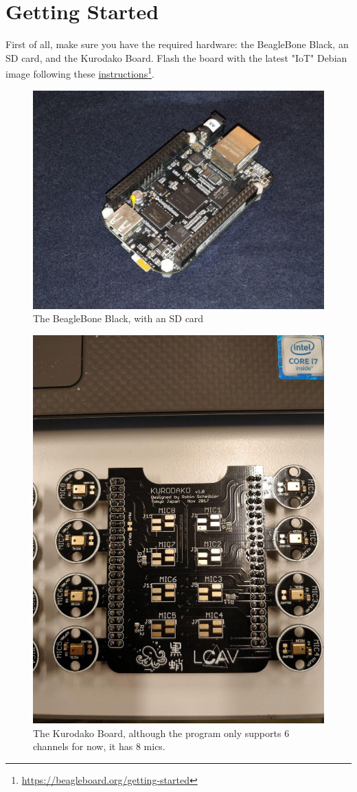 \documentclass[]{report}
\begin{document}
\hypertarget{getting-started}{%
\section{Getting Started}\label{getting-started}}

First of all, make sure you have the required hardware: the BeagleBone
Black, an SD card, and the Kurodako Board. Flash the board with the
latest "IoT" Debian image following these
\href{https://beagleboard.org/getting-started}{instructions}\footnote{\url{https://beagleboard.org/getting-started}}.

\begin{figure}[h]
\centering
\includegraphics[width=0.9\linewidth]{Pictures/BBB.jpg}
\caption{The BeagleBone Black, with an SD card}
\end{figure}

\begin{figure}[h]
\centering
\includegraphics[width=0.4\linewidth]{Pictures/kurodako.jpg}
\caption{The Kurodako Board, although the program only supports 6
channels for now, it has 8 mics.}
\end{figure}
\end{document}
